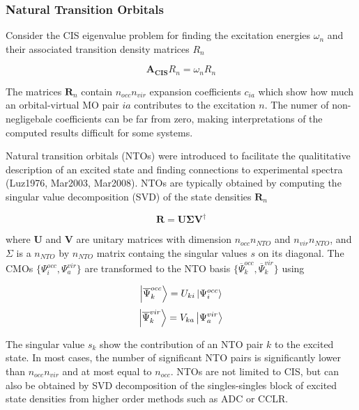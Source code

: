 \subsubsection*{Natural Transition Orbitals}

Consider the CIS eigenvalue problem for finding the excitation energies $\omega_n$ and their associated transition density matrices $R_n$

\begin{equation}
\mathbf{A_{CIS}} R_n = \omega_n R_n 
\end{equation}

The matrices $\mathbf{R}_n$ contain $n_{occ}n_{vir}$ expansion coefficients $c_{ia}$ which show how much an orbital-virtual MO pair $ia$ contributes to the excitation $n$. The numer of non-negligebale coefficients can be far from zero, making interpretations of the computed results difficult for some systems.

Natural transition orbitals (NTOs) were introduced to facilitate the qualititative description of an excited state and finding connections to experimental spectra (Luz1976, Mar2003, Mar2008). NTOs are typically obtained by computing the singular value decomposition (SVD) of the state densities $\mathbf{R}_n$

\begin{equation}
\mathbf{R} = \mathbf{U} \mathbf{\Sigma} \mathbf{V}^{\dagger}  
\end{equation} 

\noindent where $\mathbf{U}$ and $\mathbf{V}$ are unitary matrices with dimension $n_{occ} n_{NTO}$ and $n_{vir}n_{NTO}$, and $\Sigma$ is a $n_{NTO}$ by $n_{NTO}$ matrix containg the singular values $s$ on its diagonal. The CMOs $\{\Psi^{occ}_i,\Psi^{vir}_a\}$ are transformed to the NTO basis $\{\overline{\Psi}^{occ}_k,\overline{\Psi}^{vir}_k\}$ using

\begin{equation}
\ket{\overline{\Psi}^{occ}_k} = U_{ki} \ket{\Psi^{occ}_i}
\end{equation}
\begin{equation}
\ket{\overline{\Psi}^{vir}_k} = V_{ka} \ket{\Psi^{vir}_a}
\end{equation}

\noindent The singular value $s_k$ show the contribution of an NTO pair $k$ to the excited state. In most cases, the number of significant NTO pairs is significantly lower than $n_{occ}n_{vir}$ and at most equal to $n_{occ}$. NTOs are not limited to CIS, but can also be obtained by SVD decomposition of the singles-singles block of excited state densities from higher order methods such as ADC or CCLR. 

